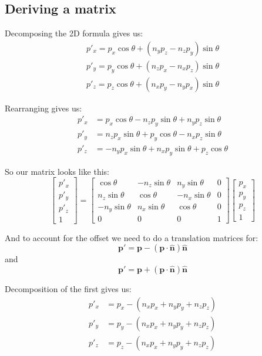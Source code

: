 \documentclass[]{report}   %
\begin{document}
\subsection{Deriving a matrix}

Decomposing the 2D formula gives us:
\begin{align*}
	p\prime_x = p_x\cos\theta + (n_y p_z - n_z p_y)\sin\theta		\\
	p\prime_y = p_y\cos\theta + (n_z p_x - n_x p_z)\sin\theta		\\
	p\prime_z = p_z\cos\theta + (n_x p_y - n_y p_x)\sin\theta
\end{align*}

Rearranging gives us:
\begin{align*}
	p\prime_x &= p_x\cos\theta - n_z p_y\sin\theta + n_y p_z\sin\theta		\\
	p\prime_y &= n_z p_x\sin\theta + p_y\cos\theta - n_x p_z\sin\theta		\\
	p\prime_z &= -n_y p_x\sin\theta + n_x p_y\sin\theta + p_z\cos\theta
\end{align*}

So our matrix looks like this:
\[
	\begin{bmatrix}
	p\prime_x \\
	p\prime_y \\
	p\prime_z \\
	1
	\end{bmatrix}
	=
	\begin{bmatrix}
	\cos\theta		&	- n_z\sin\theta		&		n_y\sin\theta	&	0	\\
	n_z\sin\theta	&	\cos\theta			&		- n_x\sin\theta	&	0	\\
	-n_y\sin\theta	&	n_x\sin\theta		&		\cos\theta		&	0	\\
			0		&			0			&				0		&	1
	\end{bmatrix}
	\begin{bmatrix}
	p_x \\
	p_y \\
	p_z \\
	1
	\end{bmatrix}	
\]

And to account for the offset we need to do a translation matrices for:
\[
\mathbf{p\prime} =  \mathbf{p}-(\mathbf{p}\cdot\mathbf{\hat{n}})\mathbf{\hat{n}}
\]
and
\[
\mathbf{p\prime} =  \mathbf{p}+(\mathbf{p}\cdot\mathbf{\hat{n}})\mathbf{\hat{n}}
\]

Decomposition of the first gives us:
\begin{align*}
	p\prime_x &= p_x - (n_x p_x + n_y p_y + n_z p_z)		\\
	p\prime_y &= p_y - (n_x p_x + n_y p_y + n_z p_z)		\\
	p\prime_z &= p_z - (n_x p_x + n_y p_y + n_z p_z)		\\
\end{align*}
\end{document}
